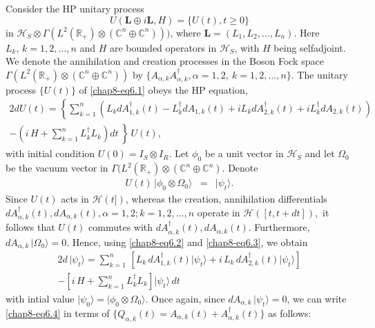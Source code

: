 Consider the HP unitary process 
\begin{equation} 
U(\mathbf{L}\oplus i\mathbf{L}, H)=\{U(t), t\geq 0\} \label{chap8-eq6.1}
\end{equation}
in $\mathcal{H}_S\otimes \Gamma(L^2(\mathbb{R}_+)\otimes (\mathbb{C}^{n}\oplus \mathbb{C}^{n})))$, where $\mathbf{L}=(L_1,L_2,\ldots, L_n)$. Here  $L_k,\, k=1,2,\ldots, n$ and $H$ are  bounded operators in  $\mathcal{H}_S$, with $H$ being selfadjoint.  We denote the annihilation and creation processes in the Boson Fock space $\Gamma(L^2(\mathbb{R}_+)\otimes (\mathbb{C}^{n}\oplus \mathbb{C}^{n}))$ by $\{A_{\alpha,k} A^\dag_{\alpha,k}, \alpha=1,2,\ k=1,2,\ldots, n\}$. The unitary process $\{U(t)\}$ of \eqref{chap8-eq6.1} obeys the HP  equation,
\begin{multline}{2}
dU(t)= \left\{ \sum_{k=1}^{n} \left(L_k dA_{1,k}^\dag(t) - L^\dag_k dA_{1,k}(t)+ i L_k dA_{2,k}^\dag(t) + iL^\dag_k dA_{2,k}(t)\right)\right. \\ 
 \left. -\left(i\, H+\sum_{k=1}^{n}L^\dag_k L_k\right) dt\ \right\}\, U(t), \label{chap8-eq6.2}
\end{multline}  
with initial condition $U(0)=I_S\otimes I_R.$  
Let $\phi_0$ be a unit vector in $\mathcal{H}_S$ and let $\Omega_0$ be the vacuum vector in  $\Gamma(L^2(\mathbb{R}_+)\otimes (\mathbb{C}^{n}\oplus \mathbb{C}^{n})$. 
Denote 
\begin{eqnarray}
U(t)\, \vert\phi_0\otimes \Omega_0\rangle&=&\vert\psi_t\rangle. \label{chap8-eq6.3}
\end{eqnarray}
Since $U(t)$ acts in $\mathcal{H}(t])$, whereas the creation, annihilation differentials  
$dA^\dag_{\alpha,k}(t), dA_{\alpha, k}(t), \alpha=1,2; k=1,2,\ldots, n$ operate in $\mathcal{H}([t, t+dt]),$  
it follows that  $U(t)$  commutes with $dA^\dag_{\alpha,k}(t), dA_{\alpha, k}(t)$. Furthermore, 
$dA_{\alpha, k}\,\vert\Omega_0\rangle=0$. Hence, using \eqref{chap8-eq6.2} and \eqref{chap8-eq6.3}, we obtain
\begin{multline}{2}
d\,\vert\psi_t\rangle =\sum_{k=1}^{n}\, \left[L_k\,  dA_{1,k}^\dag(t) \vert\psi_t\rangle 
+ i\,L_k\, dA_{2,k}^\dag(t) \vert\psi_t\rangle\right] \\
-\left[i\, H+\sum_{k=1}^{n}L^\dag_k L_k\right]\vert\psi_t\rangle \, dt \label{chap8-eq6.4}
\end{multline}  
with intial value $\vert\psi_0\rangle=\vert\phi_0\otimes \Omega_0\rangle$. Once again, since $dA_{\alpha, k}\,\vert\psi_t\rangle=0$, we can write \eqref{chap8-eq6.4} in terms of  $\{Q_{\alpha,k}(t)=A_{\alpha,k}(t)+A^\dag_{\alpha,k}(t)\}$ as follows:    
